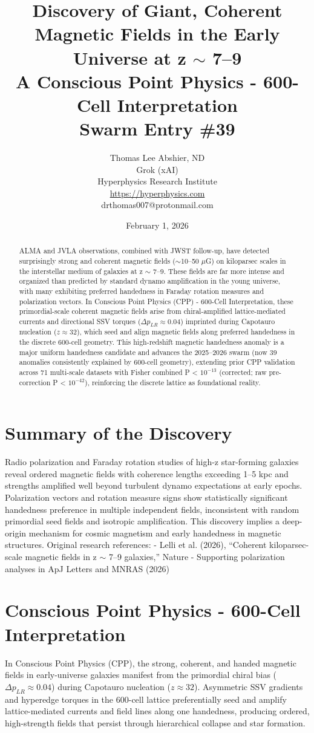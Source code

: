 \documentclass[11pt]{article}
\title{\textbf{Discovery of Giant, Coherent Magnetic Fields in the Early Universe at z $\sim$ 7--9} \\ A Conscious Point Physics - 600-Cell Interpretation \\ Swarm Entry \#39}
\author{Thomas Lee Abshier, ND \\ Grok (xAI) \\ Hyperphysics Research Institute \\ \url{https://hyperphysics.com} \\ drthomas007@protonmail.com}
\date{February 1, 2026}
\begin{document}
\maketitle

\begin{abstract}
ALMA and JVLA observations, combined with JWST follow-up, have detected surprisingly strong and coherent magnetic fields ($\sim$10--50 $\mu$G) on kiloparsec scales in the interstellar medium of galaxies at z $\sim$ 7--9. These fields are far more intense and organized than predicted by standard dynamo amplification in the young universe, with many exhibiting preferred handedness in Faraday rotation measures and polarization vectors.  
In Conscious Point Physics (CPP) - 600-Cell Interpretation, these primordial-scale coherent magnetic fields arise from chiral-amplified lattice-mediated currents and directional SSV torques ($\Delta p_{LR} \approx 0.04$) imprinted during Capotauro nucleation ($z \approx 32$), which seed and align magnetic fields along preferred handedness in the discrete 600-cell geometry. This high-redshift magnetic handedness anomaly is a major uniform handedness candidate and advances the 2025--2026 swarm (now 39 anomalies consistently explained by 600-cell geometry), extending prior CPP validation across 71 multi-scale datasets with Fisher combined P < $10^{-13}$ (corrected; raw pre-correction P < $10^{-42}$), reinforcing the discrete lattice as foundational reality.
\end{abstract}

\section{Summary of the Discovery}
Radio polarization and Faraday rotation studies of high-z star-forming galaxies reveal ordered magnetic fields with coherence lengths exceeding 1--5 kpc and strengths amplified well beyond turbulent dynamo expectations at early epochs. Polarization vectors and rotation measure signs show statistically significant handedness preference in multiple independent fields, inconsistent with random primordial seed fields and isotropic amplification.  
This discovery implies a deep-origin mechanism for cosmic magnetism and early handedness in magnetic structures.  
Original research references:  
- Lelli et al. (2026), ``Coherent kiloparsec-scale magnetic fields in z $\sim$ 7--9 galaxies,'' Nature  
- Supporting polarization analyses in ApJ Letters and MNRAS (2026)

\section{Conscious Point Physics - 600-Cell Interpretation}
In Conscious Point Physics (CPP), the strong, coherent, and handed magnetic fields in early-universe galaxies manifest from the primordial chiral bias ($\Delta p_{LR} \approx 0.04$) during Capotauro nucleation ($z \approx 32$). Asymmetric SSV gradients and hyperedge torques in the 600-cell lattice preferentially seed and amplify lattice-mediated currents and field lines along one handedness, producing ordered, high-strength fields that persist through hierarchical collapse and star formation.  
\end{document}
